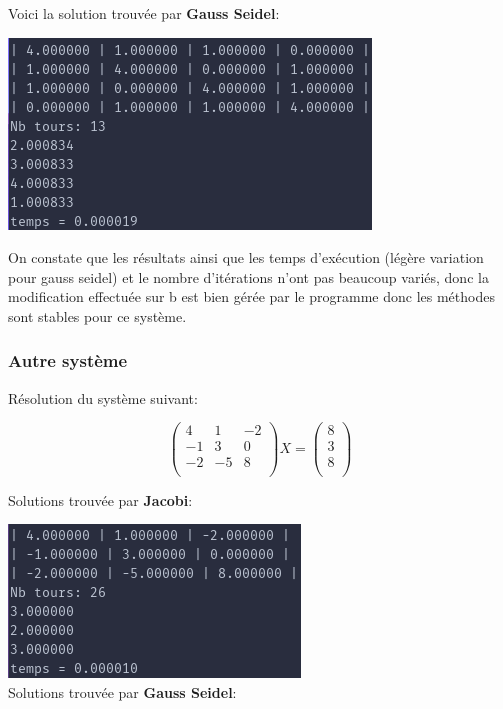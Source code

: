 \documentclass[a4paper]{article}
\begin{document}
Voici la solution trouvée par \textbf{Gauss Seidel}:

\includegraphics[scale=0.5]{./img/gauss_seidel/g_e_ex_1_mod.png}

On constate que les résultats ainsi que les temps d’exécution (légère variation
pour gauss seidel) et le nombre d'itérations n'ont pas beaucoup variés, donc la
modification effectuée sur b est bien gérée par le programme donc les méthodes
sont stables pour ce système.

\subsubsection{Autre système}

Résolution du système suivant:

\[
\begin{pmatrix}
  4 & 1 & -2\\
  -1 & 3 & 0\\
  -2 & -5 & 8\\
\end{pmatrix}X =
\begin{pmatrix}
  8\\
  3\\
  8\\
\end{pmatrix}
\]


Solutions trouvée par \textbf{Jacobi}:

\includegraphics[scale=0.5]{./img/jacobi/jac_ex_4.png}\\

Solutions trouvée par \textbf{Gauss Seidel}:
\end{document}

